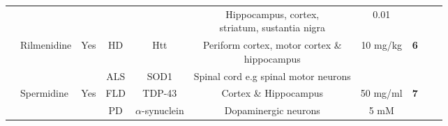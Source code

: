 \begin{landscape}
\begin{table}[p]
\begin{tabular}{llcccccccc}
 & & & & & \makecell{Hippocampus, cortex, \\striatum, sustantia nigra} &0.01 & \\\cmidrule{2-8}
 & \multirow{2}{*}{Rilmenidine} & \multirow{2}{*}{Yes} & HD & Htt & \makecell{Periform cortex, motor cortex \& \\ hippocampus} & \multirow{2}{*}{10 mg/kg} & \multirow{2}{*}{\textbf{6}} \\
 & & & ALS & SOD1 & Spinal cord e.g spinal motor neurons & & \\\cmidrule{2-8}
 & \multirow{2}{*}{Spermidine} & \multirow{2}{*}{Yes} & FLD & TDP-43 & Cortex \& Hippocampus & 50 mg/ml & \multirow{2}{*}{\textbf{7}}\\
 & & & PD & $\alpha$-synuclein & Dopaminergic neurons & 5 mM & \\
\bottomrule
\end{tabular}
\end{table}
\end{landscape}

